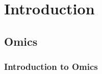 \chapter{Introduction}
\label{c:intro}







%
%



%


\section{Omics}

\subsection{Introduction to Omics}

